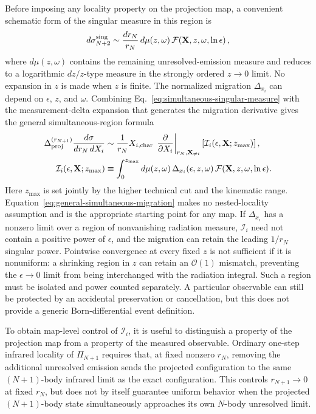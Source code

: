 \documentclass[11pt]{article}
\newcommand{\rn}{r_N}
\newcommand{\rnp}{r_{N+1}}
\begin{document}
Before imposing any locality property on the projection map, a convenient schematic form of the singular
measure in this region is
\begin{equation}
d\sigma_{N+2}^{\rm sing}
\sim
\frac{d\rn}{\rn}\,
d\mu(z,\omega)\,
\mathcal F\!\left(
\mathbf X,z,\omega,
\ln\epsilon
\right),
\label{eq:simultaneous-singular-measure}
\end{equation}
where \(d\mu(z,\omega)\) contains the remaining unresolved-emission measure and reduces to a logarithmic
\(dz/z\)-type measure in the strongly ordered \(z\to0\) limit. No expansion in \(z\) is made when \(z\) is
finite. The normalized migration \(\Delta_{x_i}\) can depend on \(\epsilon\), \(z\), and \(\omega\).
Combining Eq.~\eqref{eq:simultaneous-singular-measure} with the measurement-delta expansion that generates
the migration derivative gives the general simultaneous-region formula
\begin{equation}
\begin{aligned}
\Delta_{\rm proj}^{(\rnp)}
\frac{d\sigma}{d\rn\,dX_i}
&\sim
\frac{1}{\rn}
X_{i,\rm char}\,
\left.
\frac{\partial}{\partial X_i}
\right|_{\rn,\mathbf X_{\neq i}}
\left[
\mathcal I_i(\epsilon,\mathbf X;z_{\max})
\right],
\\
\mathcal I_i(\epsilon,\mathbf X;z_{\max})
&\equiv
\int_0^{z_{\max}}
d\mu(z,\omega)\,
\Delta_{x_i}(\epsilon,z,\omega)\,
\mathcal F(\mathbf X,z,\omega,\ln\epsilon).
\end{aligned}
\label{eq:general-simultaneous-migration}
\end{equation}
Here \(z_{\max}\) is set jointly by the higher technical cut and the kinematic range. Equation~\eqref{eq:general-simultaneous-migration}
makes no nested-locality assumption and is the appropriate starting point for any map. If \(\Delta_{x_i}\) has a
nonzero limit over a region of nonvanishing radiation measure, \(\mathcal I_i\) need not contain a positive
power of \(\epsilon\), and the migration can retain the leading \(1/\rn\) singular power. Pointwise convergence
at every fixed \(z\) is not sufficient if it is nonuniform: a shrinking region in \(z\) can retain an
\(\mathcal O(1)\) mismatch, preventing the \(\epsilon\to0\) limit from being interchanged with the radiation
integral. Such a region must be isolated and power counted separately. A particular observable can still be
protected by an accidental preservation or cancellation, but this does not provide a generic
Born-differential event definition.

To obtain map-level control of \(\mathcal I_i\), it is useful to distinguish a property of the projection map
from a property of the measured observable. Ordinary one-step infrared locality of \(\Pi_{N+1}\) requires
that, at fixed nonzero \(\rn\),
removing the additional unresolved emission sends the projected configuration to the same \((N+1)\)-body
infrared limit as the exact configuration. This controls \(\rnp\to0\) at fixed \(\rn\), but does not by
itself guarantee uniform behavior when the projected \((N+1)\)-body state simultaneously approaches its own
\(N\)-body unresolved limit.
\end{document}
